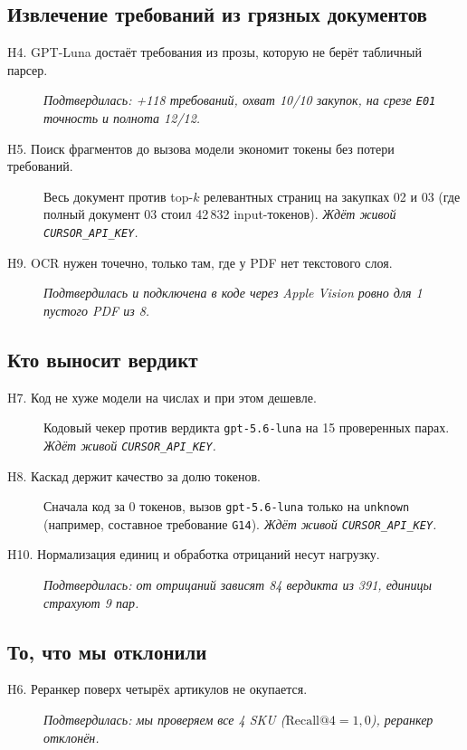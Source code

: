 \documentclass[11pt,a4paper]{article}
\begin{document}
\subsection*{Извлечение требований из грязных документов}

\begin{description}
  \item[H4. GPT-Luna достаёт требования из прозы, которую не берёт табличный парсер.] \emph{Подтвердилась: +118 требований, охват 10/10 закупок, на срезе \texttt{E01} точность и полнота 12/12.}
  \item[H5. Поиск фрагментов до вызова модели экономит токены без потери требований.] Весь документ против top-$k$ релевантных страниц на закупках 02 и 03 (где полный документ 03 стоил 42\,832 input-токенов). \emph{Ждёт живой \texttt{CURSOR\_API\_KEY}.}
  \item[H9. OCR нужен точечно, только там, где у PDF нет текстового слоя.] \emph{Подтвердилась и подключена в коде через Apple Vision ровно для 1 пустого PDF из 8.}
\end{description}

\subsection*{Кто выносит вердикт}

\begin{description}
  \item[H7. Код не хуже модели на числах и при этом дешевле.] Кодовый чекер против вердикта \texttt{gpt-5.6-luna} на 15 проверенных парах. \emph{Ждёт живой \texttt{CURSOR\_API\_KEY}.}
  \item[H8. Каскад держит качество за долю токенов.] Сначала код за 0 токенов, вызов \texttt{gpt-5.6-luna} только на \texttt{unknown} (например, составное требование \texttt{G14}). \emph{Ждёт живой \texttt{CURSOR\_API\_KEY}.}
  \item[H10. Нормализация единиц и обработка отрицаний несут нагрузку.] \emph{Подтвердилась: от отрицаний зависят 84 вердикта из 391, единицы страхуют 9 пар.}
\end{description}

\subsection*{То, что мы отклонили}

\begin{description}
  \item[H6. Реранкер поверх четырёх артикулов не окупается.] \emph{Подтвердилась: мы проверяем все 4 SKU ($\text{Recall@4}=1{,}0$), реранкер отклонён.}
\end{description}
\end{document}
